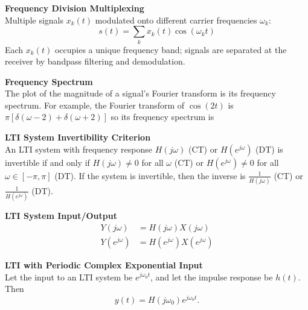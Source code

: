 \documentclass{article}
\begin{document}
\begin{multicols}{2}
    \noindent\textbf{Frequency Division Multiplexing}\\
    Multiple signals $x_k(t)$ modulated onto different carrier frequencies $\omega_k$:
    \[
        s(t) = \sum_{k} x_k(t) \cos(\omega_k t)
    \]
    Each $x_k(t)$ occupies a unique frequency band; signals are separated at the receiver by bandpass filtering and demodulation.

    \noindent\textbf{Frequency Spectrum}\\
    The plot of the magnitude of a signal's Fourier transform is its
    frequency spectrum.
    For example, the Fourier transform of $\cos(2 t)$ is
    $\pi \left[\delta(\omega - 2) + \delta(\omega + 2)\right]$
    so its frequency spectrum is
    \begin{center}
    \end{center}

    \noindent\textbf{LTI System Invertibility Criterion} \\
    An LTI system with frequency response $H(j\omega)$ (CT) or $H(e^{j\omega})$ (DT) is
    invertible if and only if $H(j\omega) \neq 0$ for all $\omega$ (CT) or $H(e^{j\omega})
        \neq 0$ for all $\omega \in [-\pi, \pi]$ (DT). If the system is invertible, then the
    inverse is $\frac{1}{H(j\omega)}$ (CT) or $\frac{1}{H(e^{j\omega})}$ (DT).

    \noindent\textbf{LTI System Input/Output}
    \begin{align*}
        Y(j\omega)     & = H(j\omega)X(j\omega)         \\
        Y(e^{j\omega}) & = H(e^{j\omega})X(e^{j\omega})
    \end{align*}

    \noindent\textbf{LTI with Periodic Complex Exponential Input} \\
    Let the input to an LTI system be $e^{j\omega_0 t}$, and let the
    impulse response be $h(t)$. Then
    \[
        y(t) = H(j\omega_0)e^{j\omega_0 t}.
    \]


\end{multicols}
\end{document}

